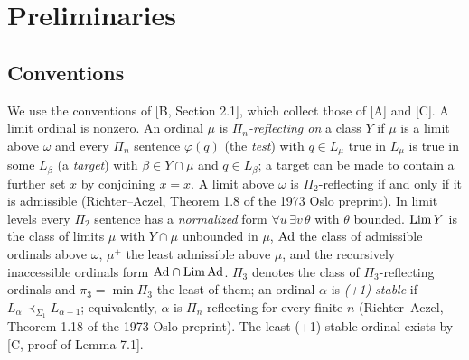 \documentclass[11pt]{article}
\begin{document}
\section{Preliminaries}

\subsection{Conventions}

We use the conventions of [B, Section 2.1], which collect those of [A] and [C]. A limit ordinal is nonzero. An
ordinal $\mu$ is \emph{$\Pi_n$-reflecting on} a class $Y$ if $\mu$ is a limit above $\omega$ and every $\Pi_n$ sentence
$\varphi(q)$ (the \emph{test}) with $q \in L_\mu$ true in $L_\mu$ is true in some $L_\beta$ (a \emph{target}) with
$\beta \in Y \cap \mu$ and $q \in L_\beta$; a target can be made to contain a further set $x$ by conjoining $x = x$. A
limit above $\omega$ is $\Pi_2$-reflecting if and only if it is admissible (Richter--Aczel, Theorem 1.8 of the 1973
Oslo preprint). In limit
levels every $\Pi_2$ sentence has a \emph{normalized} form $\forall u\, \exists v\, \theta$ with $\theta$ bounded.
$\mathrm{Lim}\, Y$ is the class of limits $\mu$ with $Y \cap \mu$ unbounded in $\mu$, $\mathrm{Ad}$ the class of admissible ordinals above
$\omega$, $\mu^+$ the least admissible above $\mu$, and the recursively inaccessible ordinals form $\mathrm{Ad} \cap \mathrm{Lim}\, \mathrm{Ad}$.
$\Pi_3$ denotes the class of $\Pi_3$-reflecting ordinals and $\pi_3 = \min \Pi_3$ the least of them; an ordinal $\alpha$ is \emph{(+1)-stable} if
$L_\alpha \prec_{\Sigma_1} L_{\alpha+1}$; equivalently, $\alpha$ is $\Pi_n$-reflecting for every finite $n$
(Richter--Aczel, Theorem 1.18 of the 1973 Oslo preprint). The least (+1)-stable ordinal exists by [C, proof of Lemma
7.1].
\end{document}
